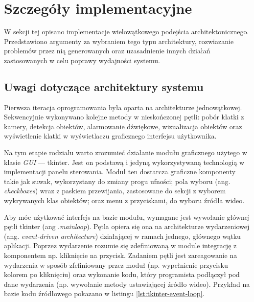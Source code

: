 \section{Szczegóły implementacyjne}
\label{chap:szczegoly-implementacji}
W sekcji tej opisano implementacje wielowątkowego podejścia architektonicznego. Przedstawiono argumenty za wybraniem tego typu architektury, rozwiazanie problemów przez nią generowanych oraz uzasadnienie innych działań zastosowanych w celu poprawy wydajności systemu.  

\subsection{Uwagi dotyczące architektury systemu}
Pierwsza iteracja oprogramowania była oparta na architekturze jednowątkowej. Sekwencyjnie wykonywano kolejne metody w nieskończonej pętli: pobór klatki z kamery, detekcja obiektów, alarmowanie dźwiękowe, wizualizacja obiektów oraz wyświetlenie klatki w wyświetlaczu graficznego interfejsu użytkownika.

Na tym etapie rodziału warto zrozumieć działanie modułu graficznego użytego w klasie \emph{GUI} --- tkinter. 
Jest on podstawą i jedyną wykorzystywaną technologią w implementacji panelu sterowania. Moduł ten dostarcza graficzne komponenty takie jak suwak, wykorzystany do zmiany progu ufności; pola wyboru (ang. \emph{checkboxes}) wraz z paskiem przewijania, zastosowane do sekcji z wyborem wykrywanych klas obiektów; oraz menu z przyciskami, do wyboru źródła wideo. 

Aby móc użytkować interfejs na bazie modułu, wymagane jest wywołanie głównej pętli tkinter (ang .\emph{mainloop}). Pętla opiera się ona na architekturze wydarzeniowej (ang. \emph{event-driven architecture}) działającej w ramach jednego, głównego wątku aplikacji. Poprzez wydarzenie rozumie się zdefiniowaną w module integrację z komponentem np. kliknięcie na przycisk. Zadaniem pętli jest zareagowanie na wydarzenia w sposób zfefiniowany przez moduł (np. wypełnienie przycisku kolorem po kliknięciu) oraz wykonanie kodu, który programista podłączył pod dane wydarzenia (np. wywołanie metody ustawiającej źródło wideo). Przykład na bazie kodu źródłowego pokazano w listingu \ref{lst:tkinter-event-loop}.


